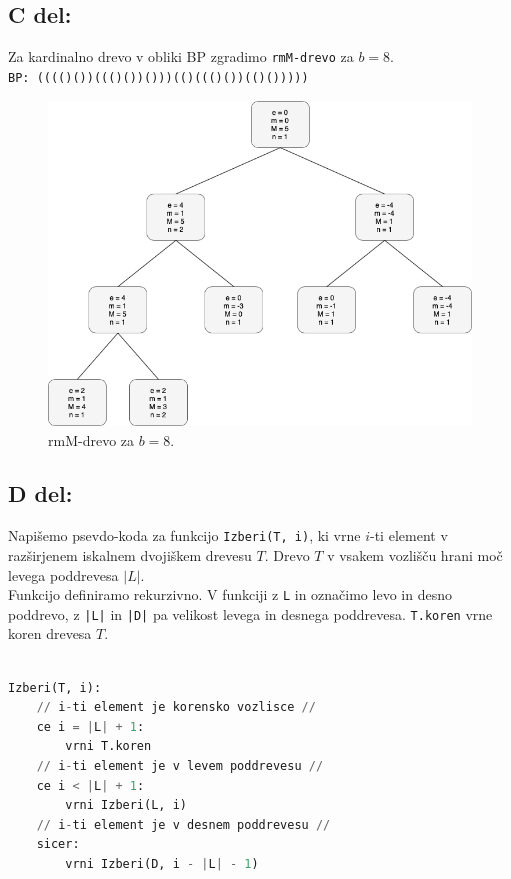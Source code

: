\documentclass[a4paper,11pt]{article}
\begin{document}

\subsection*{C del:}
Za kardinalno drevo v obliki BP zgradimo \texttt{rmM-drevo} za $b = 8$.
\\
\texttt{BP: (((()())((()())()))(()((()())(()()))))}

\begin{figure}[ht!]
    \centering
    \includegraphics[width=150mm]{graff.png}
    \caption{rmM-drevo za $b = 8$.}
\end{figure}


\newpage
\subsection*{D del:}
Napišemo psevdo-koda za funkcijo \texttt{Izberi(T, i)}, ki vrne $i$-ti element v razširjenem iskalnem dvojiškem drevesu $T$.
Drevo $T$ v vsakem vozlišču hrani moč levega poddrevesa $|L|$.
\\
Funkcijo definiramo rekurzivno. V funkciji z \texttt{L} in  označimo levo in desno poddrevo, z \texttt{|L|} in \texttt{|D|} pa velikost levega in desnega poddrevesa. \texttt{T.koren} vrne koren drevesa $T$.

\begin{lstlisting}[language=Python]

Izberi(T, i):
    // i-ti element je korensko vozlisce //
    ce i = |L| + 1:     
        vrni T.koren 
    // i-ti element je v levem poddrevesu //
    ce i < |L| + 1:    
        vrni Izberi(L, i)
    // i-ti element je v desnem poddrevesu //
    sicer:      
        vrni Izberi(D, i - |L| - 1)

\end{lstlisting}
\end{document}

